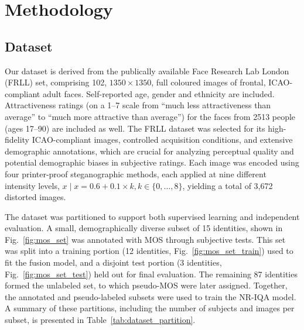 \chapter{Methodology}\label{chap:methodology}

\section{Dataset}

Our dataset is derived from the publically available Face Research Lab London~\cite{frll} (FRLL) set, comprising 102, $1350 \times 1350$, full coloured images of frontal, ICAO-compliant adult faces. Self-reported age, gender and ethnicity are included. Attractiveness ratings (on a 1--7 scale from ``much less attractiveness than average'' to ``much more attractive than average'') for the faces from 2513 people (ages 17--90) are included as well. The FRLL dataset was selected for its high-fidelity ICAO-compliant images, controlled acquisition conditions, and extensive demographic annotations, which are crucial for analyzing perceptual quality and potential demographic biases in subjective ratings. Each image was encoded using four printer-proof steganographic methods, each applied at nine different intensity levels, $x \mid x = 0.6 + 0.1 \times k, k \in \{0, \hdots, 8\}$, yielding a total of 3,672 distorted images.

The dataset was partitioned to support both supervised learning and independent evaluation. A small, demographically diverse subset of 15 identities, shown in Fig.~\ref{fig:mos_set} was annotated with MOS through subjective tests. This set was split into a training portion (12 identities, Fig.~\ref{fig:mos_set_train}) used to fit the fusion model, and a disjoint test portion (3 identities, Fig.~\ref{fig:mos_set_test}) held out for final evaluation. The remaining 87 identities formed the unlabeled set, to which pseudo-MOS were later assigned. Together, the annotated and pseudo-labeled subsets were used to train the NR-IQA model. A summary of these partitions, including the number of subjects and images per subset, is presented in Table~\ref{tab:dataset_partition}.

